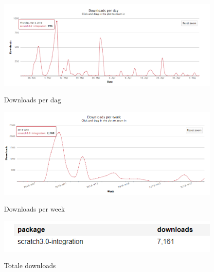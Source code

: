 \documentclass[fleqn,a4paper,12pt]{book}
\begin{document}
\begin{figure}
	\begin{center}
		\caption{Downloads per dag}
		\includegraphics[width=16cm]{img/package-downloads-day}\\[0.5cm]
	\end{center}
\end{figure}
\begin{figure}
	\begin{center}
		\caption{Downloads per week}
		\includegraphics[width=16cm]{img/package-downloads-week}\\[0.5cm]
	\end{center}
\end{figure}
\begin{figure}
	\begin{center}
		\caption{Totale downloads}
		\includegraphics[width=16cm]{img/package-total-downloads}\\[0.5cm]
	\end{center}
\end{figure}


\end{document}
